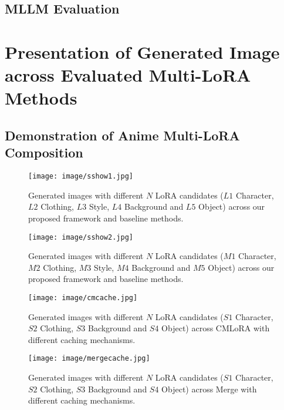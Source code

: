 

\subsection{MLLM Evaluation}



\newpage
\section{Presentation of Generated Image across Evaluated Multi-LoRA Methods}
\label{sec:visual}
\subsection{Demonstration of Anime Multi-LoRA Composition}

\begin{figure}[H]
\begin{center}
\texttt{[image: image/sshow1.jpg]}
\end{center}
\caption{Generated images with different $N$ LoRA candidates ($L1$ Character, $L2$ Clothing, $L3$ Style, $L4$ Background and $L5$ Object) across our proposed framework and baseline methods.}
\label{c1}
\end{figure}

\begin{figure}[H]
\begin{center}
\texttt{[image: image/sshow2.jpg]}
\end{center}
\caption{Generated images with different $N$ LoRA candidates ($M1$ Character, $M2$ Clothing, $M3$ Style, $M4$ Background and $M5$ Object) across our proposed framework and baseline methods. }
\label{c2}
\end{figure}

\begin{figure}[H]
\begin{center}
\texttt{[image: image/cmcache.jpg]}
\end{center}
\caption{Generated images with different $N$ LoRA candidates ($S1$ Character, $S2$ Clothing, $S3$ Background and $S4$ Object) across CMLoRA with different caching mechanisms.}
\label{c3}
\end{figure}

\begin{figure}[H]
\begin{center}
\texttt{[image: image/mergecache.jpg]}
\end{center}
\caption{Generated images with different $N$ LoRA candidates ($S1$ Character, $S2$ Clothing, $S3$ Background and $S4$ Object) across Merge with different caching mechanisms. }
\label{c4}
\end{figure}

